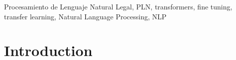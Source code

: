 \documentclass[onecolumn, journal, english, 12pt, a4paper]{IEEEtran} %
\newcommand{\printnombrecomision}{Comisión Especial de Estadística de Seguridad, Justicia, Crimen y Transparencia}
\theoremstyle{definition}
\begin{document}
\begin{abstract}
    
\end{abstract}

\begin{IEEEkeywords}
Procesamiento de Lenguaje Natural Legal, PLN, transformers, fine tuning, transfer learning, Natural Language Processing, NLP
\end{IEEEkeywords}






%
\IEEEpeerreviewmaketitle



\section{Introduction}
% 
% 
% 
% 
\end{document}
